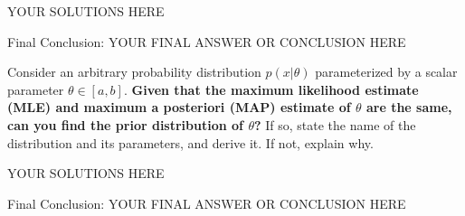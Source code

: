 \begin{solution}

YOUR SOLUTIONS HERE

{\color{red} Final Conclusion: YOUR FINAL ANSWER OR CONCLUSION HERE}

\end{solution}

\qpart{[5 points]}

Consider an arbitrary probability distribution $p(x|\theta)$ parameterized by a scalar parameter $\theta \in [a,b]$. \textbf{Given that the maximum likelihood estimate (MLE) and maximum a posteriori (MAP) estimate of $\theta$ are the same, can you find the prior distribution of $\theta$?} If so, state the name of the distribution and its parameters, and derive it. If not, explain why. 

\begin{solution}

YOUR SOLUTIONS HERE

{\color{red} Final Conclusion: YOUR FINAL ANSWER OR CONCLUSION HERE}

\end{solution}